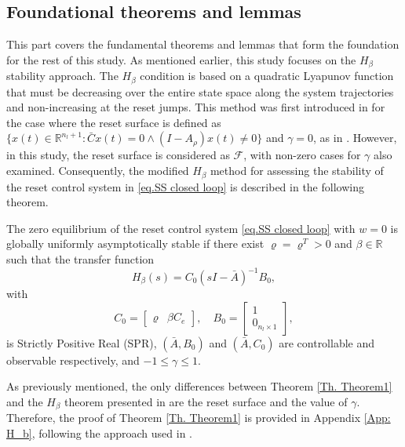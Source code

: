 \subsection{Foundational theorems and lemmas}
This part covers the fundamental theorems and lemmas that form the foundation for the rest of this study.
As mentioned earlier, this study focuses on the $H_\beta$ stability approach. The $H_\beta$ condition is based on a quadratic Lyapunov function that must be decreasing over the entire state space along the system trajectories and non-increasing at the reset jumps. This method was first introduced in \cite{beker2004fundamental} for the case where the reset surface is defined as $\{x(t) \in \mathbb{R}^{n_l+1}:\bar{C}x(t)=0 \wedge (I-A_\rho)x(t)\neq0\}$ and $\gamma=0$, as in \cite[Chapter 4.4]{banos2012reset}. However, in this study, the reset surface is considered as $\mathcal{F}$, with non-zero cases for $\gamma$ also examined. Consequently, the modified $H_\beta$ method for assessing the stability of the reset control system in \eqref{eq.SS closed loop} is described in the following theorem.\\  

\begin{theorem}
 The zero equilibrium of the reset control system \eqref{eq.SS closed loop} with $w = 0$ is globally uniformly asymptotically stable if there exist $\varrho=\varrho^T > 0$ and $\beta\in\mathbb{R}$ such that the transfer function
\begin{equation}
    \label{eq.H beta}
    H_{\beta}(s)=C_0(sI-\bar{A})^{-1}B_0,
\end{equation}
with
\begin{equation}
 C_0=\begin{bmatrix}
\varrho & \beta C_e
\end{bmatrix}, \quad
B_0= \begin{bmatrix}
    1 \\
    0_{n_l \times 1}
\end{bmatrix},
\label{eq. C0B0}
\end{equation}
is Strictly Positive Real (SPR), $(\bar{A},B_0)$ and $(\bar{A},C_0)$ are controllable and observable respectively, and $-1\leq\gamma\leq1$.
\label{Th. Theorem1}
\end{theorem}
As previously mentioned, the only differences between Theorem \ref{Th. Theorem1} and the $H_\beta$ theorem presented in \cite[Proposition 4.5]{banos2012reset} are the reset surface and the value of $\gamma$. Therefore, the proof of Theorem \ref{Th. Theorem1} is provided in Appendix \ref{App: H_b}, following the approach used in \cite[Proposition 4.5]{banos2012reset}.\\

